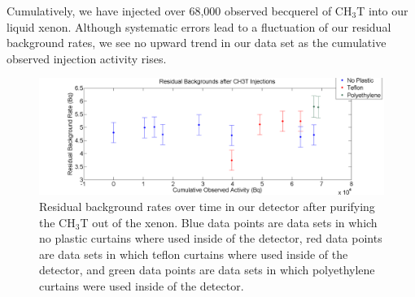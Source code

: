 Cumulatively, we have injected over 68,000 observed becquerel of CH$_3$T into our liquid xenon.  Although systematic errors lead to a fluctuation of our residual background rates, we see no upward trend in our data set as the cumulative observed injection activity rises.


\begin{figure}[h]
\centering
\includegraphics[scale=0.15]{ResidualBackgroundCorrected_SystemErr.png}
\caption{Residual background rates over time in our detector after purifying the CH$_3$T out of the xenon. Blue data points are data sets in which no plastic curtains where used inside of the detector, red data points are data sets in which teflon curtains where used inside of the detector, and green data points are data sets in which polyethylene curtains were used inside of the detector.}
\label{fig:ResBack}
\end{figure}